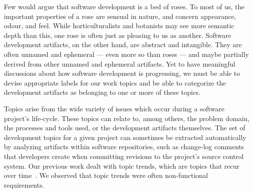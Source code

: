 \documentclass{acm_proc_article-sp}
\begin{document}
Few would argue that software development is a bed of roses.  To most of us, the important properties of a rose are sensual in nature, and concern appearance, odour, and feel.  While horticulturalists and botanists may see more semantic depth than this, one rose is often just as pleasing to us as another.  Software development artifacts, on the other hand, are abstract and intangible.  They are often unnamed and ephemeral --- even more so than roses --- and maybe partially derived from other unnamed and ephemeral artifacts.  Yet to have meaningful discussions about how software development is progressing, we must be able to devise appropriate labels for our work topics and be able to categorize the development artifacts as belonging to one or more of these topics. 





Topics arise from the wide variety of issues which occur during a software project's life-cycle. These topics can relate to, among others, the problem domain, the processes and tools used, or the development artifacts themselves.  The set of development topics for a given project can sometimes be extracted automatically by analyzing artifacts within software repositories, such as change-log comments that developers create when committing revisions to the project's source control system.  Our previous work dealt with topic trends, which are topics that recur over time~\cite{Hindle09ICSM}. We observed that topic trends were often non-functional requirements.


\end{document}

